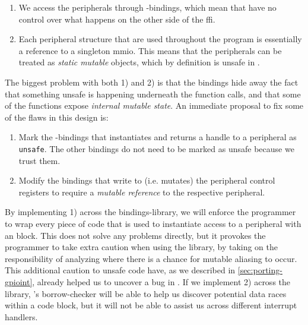 \begin{enumerate}[\hspace{13pt}1)]
    \item We access the peripherals through {\C}-bindings, which mean that {\rust} have no control over what happens on the other side of the \gls{ffi}.

    \item Each peripheral structure that are used throughout the program is essentially a reference to a singleton \gls{mmio}.
    This means that the peripherals can be treated as \emph{static mutable} objects, which by definition is unsafe in {\rust}.

\end{enumerate}

The biggest problem with both 1) and 2) is that the bindings hide away the fact that something unsafe is happening underneath the function calls, and that some of the functions expose \emph{internal mutable state}.
An immediate proposal to fix some of the flaws in this design is:

\begin{enumerate}[\hspace{13pt}1)]
    \item Mark the {\rust}-bindings that instantiates and returns a handle to a peripheral as \texttt{unsafe}.
    The other bindings do not need to be marked as unsafe because we trust them.

    \item Modify the bindings that write to (i.e. mutates) the peripheral control registers to require a \emph{mutable reference} to the respective peripheral.
\end{enumerate}

By implementing 1) across the bindings-library, we will enforce the programmer to wrap every piece of code that is used to instantiate access to a peripheral with an  block.
This does not solve any problems directly, but it provokes the programmer to take extra caution when using the library, by taking on the responsibility of analyzing where there is a chance for mutable aliasing to occur.
This additional caution to unsafe code have, as we described in \autoref{sec:porting-gpioint}, already helped us to uncover a bug in .
If we implement 2) across the library, {\rust}'s borrow-checker will be able to help us discover potential data races within a code block, but it will not be able to assist us across different interrupt handlers.

